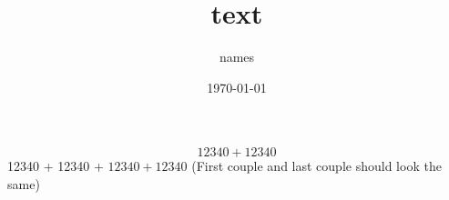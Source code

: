 \documentclass[%
cdfont=false,
cdmath=false,cd=false
]{tudscrbook}
\begin{document}
\title{text}
\author{names}
\date{\today}

\makecover[cdcover]

\maketitle[cd=false]

  \[
  12340 + \num{12340}
  \]
  12340 + \num{12340} + 
  \(12340 + \num{12340}\) 
  (First couple and last couple should look the same)
\end{document}
